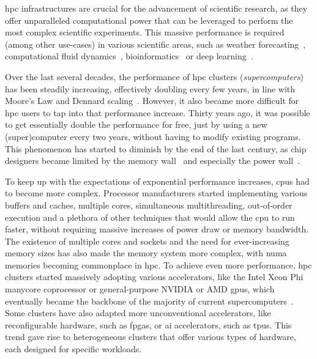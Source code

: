 \gls{hpc} infrastructures are crucial for the advancement of scientific
research, as they offer unparalleled computational power that can be leveraged to perform the most
complex scientific experiments. This massive performance is required (among other use-cases) in
various scientific areas, such as weather forecasting~\cite{wrf}, computational fluid
dynamics~\cite{cfd}, bioinformatics~\cite{bioinformatics} or deep
learning~\cite{hpcdl}.

Over the last several decades, the performance of \gls{hpc} clusters
(\emph{supercomputers}) has been steadily increasing, effectively doubling every few years, in
line with Moore's Law and Dennard scaling~\cite{mooreslaw}. However, it also became more
difficult for \gls{hpc} users to tap into that performance increase. Thirty years ago,
it was possible to get essentially double the performance for free, just by using a new
(super)computer every two years, without having to modify existing programs. This phenomenon has
started to diminish by the end of the last century, as chip designers became limited by the memory
wall~\cite{memorywall} and especially the power wall~\cite{powerwall}.

To keep up with the expectations of exponential performance increases, \glspl{cpu} had
to become more complex. Processor manufacturers started implementing various buffers and caches,
multiple cores, simultaneous multithreading, out-of-order execution and a plethora of other
techniques that would allow the \gls{cpu} to run faster, without requiring massive
increases of power draw or memory bandwidth. The existence of multiple cores and sockets and the
need for ever-increasing memory sizes has also made the memory system more complex, with
\gls{numa} memories becoming commonplace in \gls{hpc}. To achieve even
more performance, \gls{hpc} clusters started massively adopting various accelerators,
like the Intel Xeon Phi~\cite{xeonphi} manycore coprocessor or general-purpose NVIDIA or
AMD \glspl{gpu}, which eventually became the backbone of the majority of current
supercomputers~\cite{top500gpu}. Some clusters have also adapted more unconventional
accelerators, like reconfigurable hardware, such as \glspl{fpga}, or
\gls{ai} accelerators, such as \glspl{tpu}. This trend gave rise to
heterogeneous clusters that offer various types of hardware, each designed for specific workloads.

